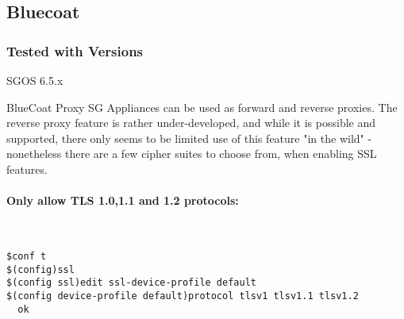 %
%
%
%
\subsection{Bluecoat}
\subsubsection{Tested with Versions}
\begin{itemize*}
  \item SGOS 6.5.x
\end{itemize*}

BlueCoat Proxy SG Appliances can be used as forward and reverse proxies. The reverse proxy feature is rather under-developed, and while it is possible and supported, there only seems to be limited use of this feature "in the wild" - nonetheless there are a few cipher suites to choose from, when enabling SSL features.

\paragraph*{Only allow TLS 1.0,1.1 and 1.2 protocols:}
~
\begin{lstlisting}
$conf t
$(config)ssl
$(config ssl)edit ssl-device-profile default
$(config device-profile default)protocol tlsv1 tlsv1.1 tlsv1.2
  ok
\end{lstlisting}

